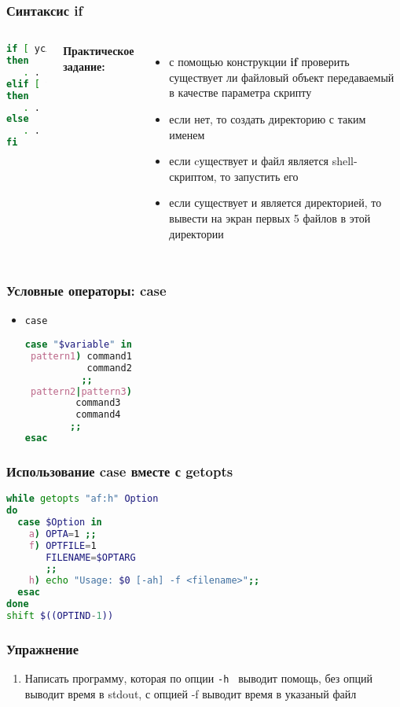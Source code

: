 
\begin{frame}[fragile]
\frametitle{Синтаксис {\bf if}}

	\begin{columns}
	
	\begin{lstlisting}[language=bash]
if [ условие1 ]
then
   . . .
elif [ условие2 ]
then
   . . .
else
   . . .
fi
\end{lstlisting}
	{\bf Практическое задание:} \\
	\begin{itemize}

		\item с помощью конструкции {\bf if} проверить существует ли файловый объект передаваемый в качестве параметра скрипту
		\item если нет, то создать директорию с таким именем
		\item если cуществует и файл является shell-скриптом, то запустить его
		\item если существует и является директорией, то вывести на экран первых 5 файлов в этой директории
	\end{itemize}
	\end{columns}
\end{frame}

\begin{frame}[fragile]
\frametitle{Условные операторы: case}
\begin{itemize}
\item {\tt case}
\begin{lstlisting}[language=sh,frame=single]
case "$variable" in 
 pattern1) command1
           command2
          ;;
 pattern2|pattern3)
         command3
         command4
        ;;
esac
\end{lstlisting}
\end{itemize}
\end{frame}

\begin{frame}[fragile]
\frametitle{Использование case вместе с getopts}
\begin{lstlisting}[language=sh,frame=single]
while getopts "af:h" Option
do
  case $Option in 
    a) OPTA=1 ;;
    f) OPTFILE=1
       FILENAME=$OPTARG
       ;;
    h) echo "Usage: $0 [-ah] -f <filename>";;
  esac  
done
shift $((OPTIND-1))
\end{lstlisting}
\end{frame}

\begin{frame}[fragile]
\frametitle{Упражнение}
\begin{enumerate}
\item Написать программу, которая по опции {\tt -h } выводит помощь, без опций выводит время в stdout,
с опцией -f выводит время в указаный файл
\end{enumerate}
\end{frame}
